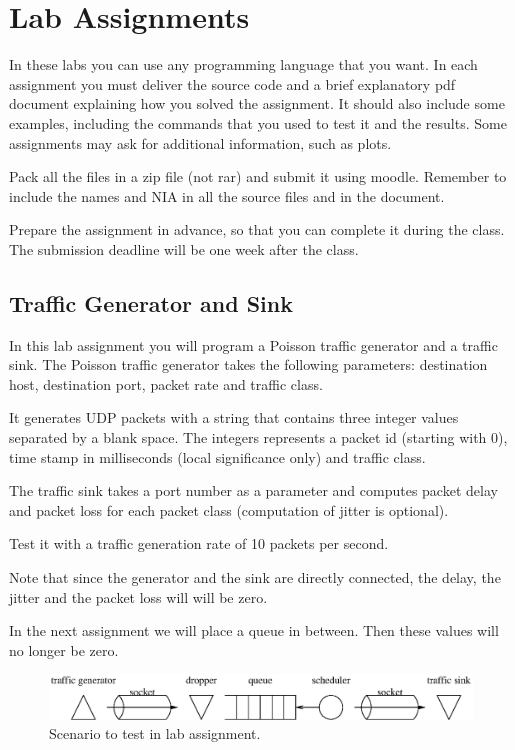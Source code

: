 \chapter{Lab Assignments}

In these labs you can use any programming language that you want. 
In each assignment you must deliver the source code and a brief explanatory pdf document explaining how you solved the assignment.
It should also include some examples, including the commands that you used to test it and the results.
Some assignments may ask for additional information, such as plots.

Pack all the files in a zip file (not rar) and submit it using moodle.
Remember to include the names and NIA in all the source files and in the document.

Prepare the assignment in advance, so that you can complete it during the class.
The submission deadline will be one week after the class.

\section{Traffic Generator and Sink}

In this lab assignment you will program a Poisson traffic generator and a traffic sink.
The Poisson traffic generator takes the following parameters:
destination host, destination port, packet rate and traffic class.

It generates UDP packets with a string that contains three integer values separated by a blank space. The integers represents a packet id (starting with 0), time stamp in milliseconds (local significance only) and traffic class.

The traffic sink takes a port number as a parameter and computes packet delay and packet loss for each packet class (computation of jitter is optional).

Test it with a traffic generation rate of 10 packets per second.

Note that since the generator and the sink are directly connected, the delay, the jitter and the packet loss will will be zero.

In the next assignment we will place a queue in between.
Then these values will no longer be zero.

\begin{figure}[!h]
\centering
\includegraphics[width=\linewidth]{figures/scenario.eps}
\caption{Scenario to test in lab assignment.}
\label{fig:scenario}
\end{figure}

